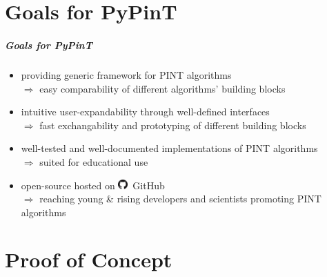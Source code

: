 \documentclass[%
  english,
  hyperref={pdfpagelabels=false},
  aspectratio=1610]{beamer}
\begin{document}
\part{Goals for PyPinT}
\makepart

\begin{frame}
  \frametitle{Goals for PyPinT}
  
  \begin{itemize}
    \item<1-> providing generic framework for PINT algorithms\\
      {\color{fzjblue50}$\Rightarrow$ easy comparability of different algorithms' building blocks\\[1.5em]}
    \item<3-> intuitive user-expandability through well-defined interfaces\\
      {\color{fzjblue50}$\Rightarrow$ fast exchangability and prototyping of different building blocks\\[1.5em]}
    \item<5-> well-tested and well-documented implementations of PINT algorithms\\
      {\color{fzjblue50}$\Rightarrow$ suited for educational use\\[1.5em]}
    \item<7-> open-source hosted on \includegraphics[height=1em]{src/GitHub-Mark-32px.png}~GitHub\\
      {\color{fzjblue50}$\Rightarrow$ reaching young \& rising developers and scientists promoting PINT algorithms\\[1.5em]}
  \end{itemize}
\end{frame}


\part{Proof of Concept}
\makepart
\end{document}
